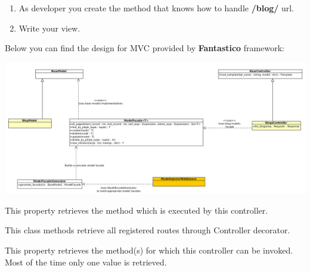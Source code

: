 \documentclass[letterpaper,10pt,english]{sphinxmanual}
\begin{document}
\begin{fulllineitems}
\begin{enumerate}
\item {} 
As developer you create the method that knows how to handle \textbf{/blog/} url.

\item {} 
Write your view.

\end{enumerate}

Below you can find the design for MVC provided by \textbf{Fantastico} framework:

\includegraphics{mvc.png}

\begin{fulllineitems}
\label{features/mvc:fantastico.mvc.controller_decorators.Controller.fn_handler}
This property retrieves the method which is executed by this controller.

\end{fulllineitems}


\begin{fulllineitems}
\label{features/mvc:fantastico.mvc.controller_decorators.Controller.get_registered_routes}
This class methods retrieve all registered routes through Controller decorator.

\end{fulllineitems}


\begin{fulllineitems}
\label{features/mvc:fantastico.mvc.controller_decorators.Controller.method}
This property retrieves the method(s) for which this controller can be invoked. Most of the time only one value is
retrieved.


\end{fulllineitems}
\end{fulllineitems}
\end{document}

